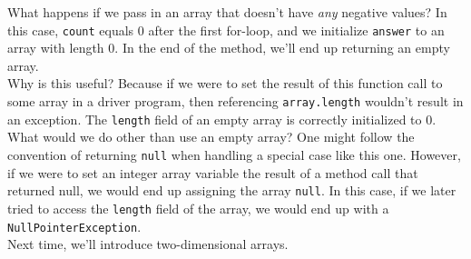 What happens if we pass in an array that doesn't have \textit{any} negative values? In this case, \verb!count! equals $0$ after the first for-loop, and we initialize \verb!answer! to an array with length $0$. In the end of the method, we'll end up returning an empty array. \\

Why is this useful? Because if we were to set the result of this function call to some array in a driver program, then referencing \verb!array.length! wouldn't result in an exception. The \verb!length! field of an empty array is correctly initialized to $0$. \\

What would we do other than use an empty array? One might follow the convention of returning \verb!null! when handling a special case like this one. However, if we were to set an integer array variable the result of a method call that returned null, we would end up assigning the array \verb!null!. In this case, if we later tried to access the \verb!length! field of the array, we would end up with a \verb!NullPointerException!. \\

Next time, we'll introduce two-dimensional arrays.